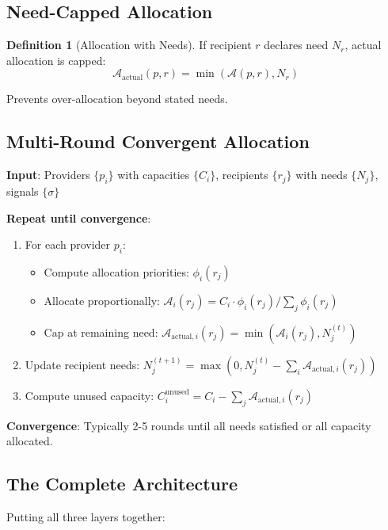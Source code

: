 \documentclass[11pt,a4paper]{article}
\theoremstyle{definition}
\newtheorem{definition}[theorem]{Definition}
\theoremstyle{remark}
\newcommand{\A}{\mathcal{A}}
\begin{document}
\subsection{Need-Capped Allocation}

\begin{definition}[Allocation with Needs]
If recipient $r$ declares need $N_r$, actual allocation is capped:
\[ \A_{\text{actual}}(p,r) = \min(\A(p,r), N_r) \]

Prevents over-allocation beyond stated needs.
\end{definition}

\subsection{Multi-Round Convergent Allocation}

\begin{algorithm}
\textbf{Input}: Providers $\{p_i\}$ with capacities $\{C_i\}$, recipients $\{r_j\}$ with needs $\{N_j\}$, signals $\{\sigma\}$

\textbf{Repeat until convergence}:
\begin{enumerate}
\item For each provider $p_i$:
   \begin{itemize}
   \item Compute allocation priorities: $\phi_i(r_j)$
   \item Allocate proportionally: $\A_i(r_j) = C_i \cdot \phi_i(r_j) / \sum_j \phi_i(r_j)$
   \item Cap at remaining need: $\A_{\text{actual},i}(r_j) = \min(\A_i(r_j), N_j^{(t)})$
   \end{itemize}
\item Update recipient needs: $N_j^{(t+1)} = \max(0, N_j^{(t)} - \sum_i \A_{\text{actual},i}(r_j))$
\item Compute unused capacity: $C_i^{\text{unused}} = C_i - \sum_j \A_{\text{actual},i}(r_j)$
\end{enumerate}

\textbf{Convergence}: Typically 2-5 rounds until all needs satisfied or all capacity allocated.
\end{algorithm}

\subsection{The Complete Architecture}

Putting all three layers together:
\end{document}
